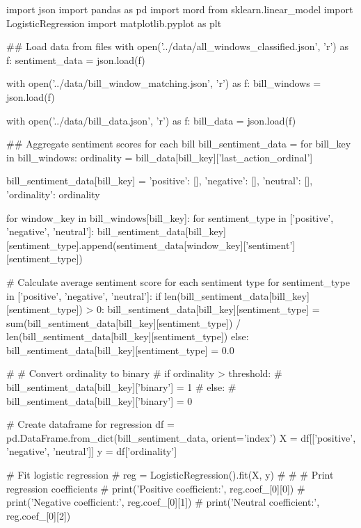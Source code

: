 
\begin{pyin}
import json
import pandas as pd
import mord
from sklearn.linear_model import LogisticRegression
import matplotlib.pyplot as plt
\end{pyin}

\begin{pyin}
\## Load data from files
with open('../data/all_windows_classified.json', 'r') as f:
    sentiment_data = json.load(f)

with open('../data/bill_window_matching.json', 'r') as f:
    bill_windows = json.load(f)

with open('../data/bill_data.json', 'r') as f:
    bill_data = json.load(f)
\end{pyin}

\begin{pyin}
\## Aggregate sentiment scores for each bill
bill_sentiment_data = {}
for bill_key in bill_windows:
    ordinality = bill_data[bill_key]['last_action_ordinal']

    bill_sentiment_data[bill_key] = {'positive': [], 'negative': [], 'neutral': [], 'ordinality': ordinality}

    for window_key in bill_windows[bill_key]:
        for sentiment_type in ['positive', 'negative', 'neutral']:
            bill_sentiment_data[bill_key][sentiment_type].append(sentiment_data[window_key]['sentiment'][sentiment_type])

    # Calculate average sentiment score for each sentiment type
    for sentiment_type in ['positive', 'negative', 'neutral']:
        if len(bill_sentiment_data[bill_key][sentiment_type]) > 0:
            bill_sentiment_data[bill_key][sentiment_type] = sum(bill_sentiment_data[bill_key][sentiment_type]) / len(bill_sentiment_data[bill_key][sentiment_type])
        else:
            bill_sentiment_data[bill_key][sentiment_type] = 0.0

    # # Convert ordinality to binary
    # if ordinality > threshold:
    #     bill_sentiment_data[bill_key]['binary'] = 1
    # else:
    #     bill_sentiment_data[bill_key]['binary'] = 0

# Create dataframe for regression
df = pd.DataFrame.from_dict(bill_sentiment_data, orient='index')
X = df[['positive', 'negative', 'neutral']]
y = df['ordinality']

# Fit logistic regression
# reg = LogisticRegression().fit(X, y)
#
# # Print regression coefficients
# print('Positive coefficient:', reg.coef_[0][0])
# print('Negative coefficient:', reg.coef_[0][1])
# print('Neutral coefficient:', reg.coef_[0][2])


\end{pyin}
